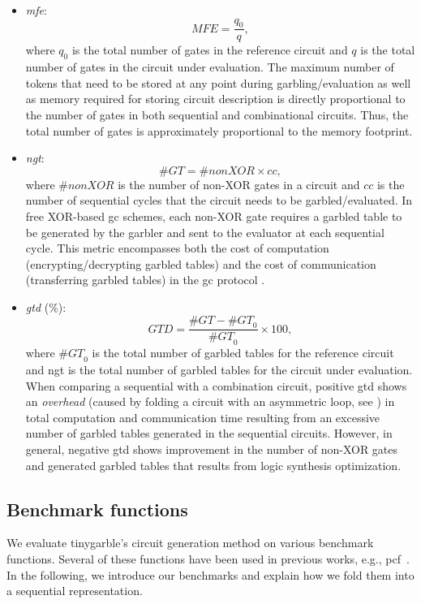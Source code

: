 \begin{itemize}
\item \textit{\acrfull{mfe}}: $$\mathit{MFE} = \dfrac{q_{0}}{q},$$ where $q_{0}$ is the total number of gates in the reference circuit and $q$ is the total number of gates in the circuit under evaluation.
		The maximum number of tokens that need to be stored at any point during garbling/evaluation as well as memory required for storing circuit description is directly proportional to the number of gates in both sequential and combinational circuits.
		Thus, the total number of gates is approximately proportional to the memory footprint.

\item \textit{\acrfull{ngt}}: $$\mathit{\#GT} = \#nonXOR\times cc,$$ where $\#nonXOR$ is the number of non-XOR gates in a circuit and $cc$ is the number of sequential cycles that the circuit needs to be garbled/evaluated.
		In free XOR-based \acrshort{gc} schemes, each non-XOR gate requires a garbled table to be generated by the garbler and sent to the evaluator at each sequential cycle.
		This metric encompasses both the cost of computation (encrypting/decrypting garbled tables) and the cost of communication (transferring garbled tables) in the \acrshort{gc} protocol \cite{kolesnikov2008improved}.

\item \textit{\acrfull{gtd}} (\%): $$\mathit{GTD} = \dfrac{\mathit{\#GT} - \mathit{\#GT}_{0}}{\mathit{\#GT}_{0}} \times 100,$$ where $\mathit{\#GT}_{0}$ is the total number of garbled tables for the reference circuit and \acrshort{ngt} is the total number of garbled tables for the circuit under evaluation.
		When comparing a sequential with a combination circuit, positive \acrshort{gtd} shows an \emph{overhead} (caused by folding a circuit with an asymmetric loop, see ) in total computation and communication time resulting from an excessive number of garbled tables generated in the sequential circuits.
		However, in general, negative \acrshort{gtd} shows improvement in the number of non-XOR gates and generated garbled tables that results from logic synthesis optimization.
\end{itemize}

\subsection{Benchmark functions}\label{ssec:eval-tinygarble-benchmark}
We evaluate \gls{tinygarble}'s circuit generation method on various benchmark functions.
Several of these functions have been used in previous works, e.g., \gls{pcf}~\cite{kreuter2013pcf}.
In the following, we introduce our benchmarks and explain how we fold them into a sequential representation.

